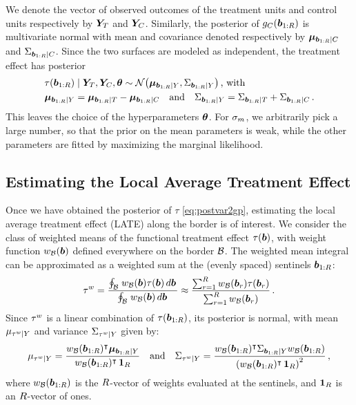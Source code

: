 \documentclass{article}
\begin{document}
We denote the vector of observed outcomes of the treatment units and control units respectively by \(\bm{Y}_{T}\) and \(\bm{Y}_{C}\).
Similarly, the posterior of \(g_C{}(\bm{b}_{1:R})\) is multivariate normal with mean and covariance denoted respectively by \(\bm{\mu}_{\bm{b}_{1:R} \mid C}\) and \(\Sigma_{\bm{b}_{1:R} \mid C}\).
Since the two surfaces are modeled as independent, the treatment effect has posterior
\begin{equation}
    \begin{split}
        & \tau(\sentinels) \mid \yt, \yc, \hyperparam \sim \normal\del{\muvec_{\sentinels \mid Y}, \Sigma_{\sentinels \mid Y}} \,\text{, with}\\
        & \muvec_{\sentinels \mid Y} = \muvec_{\sentinels \mid \treat} - \muvec_{\sentinels \mid \ctrol} \quad\text{and}\quad
        \Sigma_{\sentinels \mid Y} = \Sigma_{\sentinels \mid \treat} + \Sigma_{\sentinels \mid \ctrol} \,.
    \end{split}
    \label{eq:postvar2gp}
\end{equation}
This leaves the choice of the hyperparameters \(\bm{\theta}\).
For \(\sigma_{m}\), we arbitrarily pick a large number, so that the prior on the mean parameters is weak, while the other parameters are fitted by maximizing the marginal likelihood.

\subsection{Estimating the Local Average Treatment Effect}
\label{sec:ate}

Once we have obtained the posterior of \(\tau\) \eqref{eq:postvar2gp}, estimating the local average treatment effect (LATE) along the border is of interest.
We consider the class of weighted means of the functional treatment effect \(\tau\del{\sentinel}\),
with weight function \(w_{\mathcal{B}}(\bm{b})\) defined everywhere on the border \(\mathcal{B}\).
The weighted mean integral can be approximated as a weighted sum at the (evenly spaced) sentinels \(\bm{b}_{1:R}\):
\begin{equation}
    \tau^{w} = \frac{\oint_{\mathcal{B}} \left. w_{\mathcal{B}}(\bm{b}) \tau(\bm{b}) \mathop{d \bm{b}} \right.}
    {\oint_{\mathcal{B}} \left. w_{\mathcal{B}}(\bm{b}) \mathop{d \bm{b}} \right.}
    \approx \frac{\sum_{r=1}^R w_{\mathcal{B}}(\bm{b}_r) \tau(\bm{b}_r)}
    {\sum_{r=1}^R w_{\mathcal{B}}(\bm{b}_r) } \,.
\label{eq:weighted_estimand}
\end{equation}
Since \(\tau^{w}\) is a linear combination of \(\tau(\bm{b}_{1:R})\), its posterior is normal, with mean \(\mu_{\tau^{w} \mid Y}\) and variance \(\Sigma_{\tau^{w} \mid Y}\) given by:
\begin{equation}
    \mu_{\tau^{w} \mid Y} = \frac{w_{\mathcal{B}}(\bm{b}_{1:R})^{\intercal} \bm{\mu}_{\bm{b}_{1:R} \mid Y}}
    {w_{\mathcal{B}}(\bm{b}_{1:R})^{\intercal}  \operatorname{\mathbf{1}}_R}\quad\text{and}\quad
    \Sigma_{\tau^{w} \mid Y} = \frac{w_{\mathcal{B}}(\bm{b}_{1:R})^{\intercal} \Sigma_{\bm{b}_{1:R} \mid Y} w_{\mathcal{B}}(\bm{b}_{1:R})}
    { \left\lparen w_{\mathcal{B}}(\bm{b}_{1:R})^{\intercal}  \operatorname{\mathbf{1}}_R \right\rparen^2 } \,,
\label{eq:weighted_estimator}
\end{equation}
where \(w_{\mathcal{B}}(\bm{b}_{1:R})\) is the \(R\)-vector of weights evaluated at the sentinels, and \(\operatorname{\mathbf{1}}_R\) is an \(R\)-vector of ones.
\end{document}
